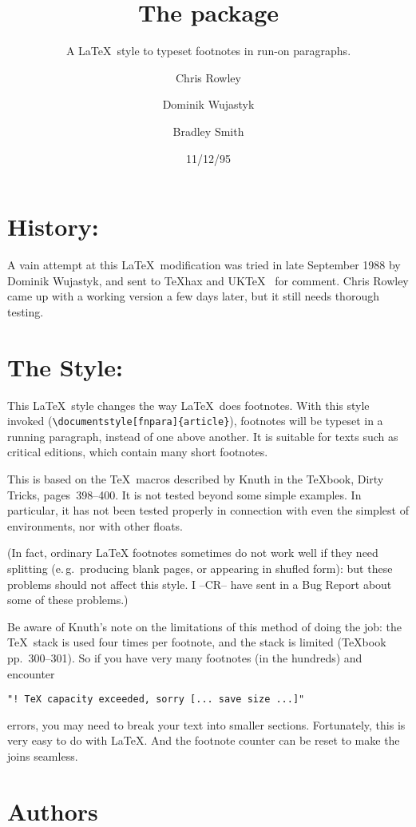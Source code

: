\documentclass[DIV=9, pagesize=auto]{scrartcl}
\title{The \pkg{fnpara} package}
\subtitle{A \LaTeX\ style to typeset footnotes in run-on paragraphs.}
\author{Chris Rowley\and Dominik Wujastyk\and Bradley Smith}
\date{11/12/95}
\begin{document}
\maketitle

\section{History:}

A vain attempt at this \LaTeX\ modification was tried in late
September 1988 by Dominik Wujastyk, and sent to \TeX hax and UK\TeX\ %
for comment.  Chris Rowley came up with a working
version a few days later, but it still needs thorough testing.


\section{The Style:}

This \LaTeX\ style changes the way \LaTeX\ does footnotes.  With this
style invoked (\verb+\documentstyle[fnpara]{article}+), footnotes will
be typeset in a running paragraph, instead of one above another.
It is suitable for texts such as critical editions, which contain
many short footnotes.

This is based on the \TeX\ macros described by Knuth in the
\TeX book, Dirty Tricks, pages~398--400.  It is  not tested beyond
some simple examples.   In particular, it has not been tested
properly in connection with even the simplest of environments, nor with
other floats.

(In fact, ordinary LaTeX footnotes sometimes do not work well
if they need splitting (e.\,g.\ producing blank pages,
or appearing in shufled form): but these
problems should not affect this style.
I --CR-- have sent in a Bug Report about some
of these problems.)

Be aware of Knuth's note on the limitations of this method of
doing the job:  the \TeX\ stack is used four times per footnote,
and the stack is limited (\TeX book pp.~300--301).  So if you have
very many footnotes (in the hundreds) and encounter
%
\begin{verbatim}
"! TeX capacity exceeded, sorry [... save size ...]"
\end{verbatim}
%
errors, you may need to break your text into smaller sections.
Fortunately, this is very easy to do with \LaTeX.  And the
footnote counter can be reset to make the joins seamless.


\section{Authors}
\end{document}
